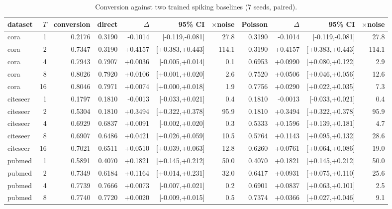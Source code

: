 \begin{table}[t]
\centering
\footnotesize
\caption{Conversion against two trained spiking baselines (7 seeds, paired).}
\label{tab:baselines}
\begin{tabular}{lrrrrrrrrrr}
\toprule
dataset & $T$ & conversion & direct & $\Delta$ & 95\% CI & $\times$noise & Poisson & $\Delta$ & 95\% CI & $\times$noise \\
\midrule
cora & 1 & 0.2176 & 0.3190 & -0.1014 & [-0.119,-0.081] & 27.8 & 0.3190 & -0.1014 & [-0.119,-0.081] & 27.8 \\
cora & 2 & 0.7347 & 0.3190 & +0.4157 & [+0.383,+0.443] & 114.1 & 0.3190 & +0.4157 & [+0.383,+0.443] & 114.1 \\
cora & 4 & 0.7943 & 0.7907 & +0.0036 & [-0.005,+0.014] & 0.1 & 0.6953 & +0.0990 & [+0.080,+0.122] & 2.9 \\
cora & 8 & 0.8026 & 0.7920 & +0.0106 & [+0.001,+0.020] & 2.6 & 0.7520 & +0.0506 & [+0.046,+0.056] & 12.6 \\
cora & 16 & 0.8046 & 0.7971 & +0.0074 & [+0.000,+0.018] & 1.9 & 0.7756 & +0.0290 & [+0.022,+0.035] & 7.3 \\
citeseer & 1 & 0.1797 & 0.1810 & -0.0013 & [-0.033,+0.021] & 0.4 & 0.1810 & -0.0013 & [-0.033,+0.021] & 0.4 \\
citeseer & 2 & 0.5304 & 0.1810 & +0.3494 & [+0.322,+0.378] & 95.9 & 0.1810 & +0.3494 & [+0.322,+0.378] & 95.9 \\
citeseer & 4 & 0.6929 & 0.6837 & +0.0091 & [-0.002,+0.020] & 0.3 & 0.5333 & +0.1596 & [+0.139,+0.181] & 4.7 \\
citeseer & 8 & 0.6907 & 0.6486 & +0.0421 & [+0.026,+0.059] & 10.5 & 0.5764 & +0.1143 & [+0.095,+0.132] & 28.6 \\
citeseer & 16 & 0.7021 & 0.6511 & +0.0510 & [+0.039,+0.063] & 12.8 & 0.6260 & +0.0761 & [+0.064,+0.086] & 19.0 \\
pubmed & 1 & 0.5891 & 0.4070 & +0.1821 & [+0.145,+0.212] & 50.0 & 0.4070 & +0.1821 & [+0.145,+0.212] & 50.0 \\
pubmed & 2 & 0.7349 & 0.6184 & +0.1164 & [+0.014,+0.231] & 32.0 & 0.6417 & +0.0931 & [+0.075,+0.110] & 25.6 \\
pubmed & 4 & 0.7739 & 0.7666 & +0.0073 & [-0.007,+0.021] & 0.2 & 0.6901 & +0.0837 & [+0.063,+0.101] & 2.5 \\
pubmed & 8 & 0.7740 & 0.7720 & +0.0020 & [-0.009,+0.015] & 0.5 & 0.7374 & +0.0366 & [+0.027,+0.046] & 9.1 \\

\end{tabular}
\end{table}
